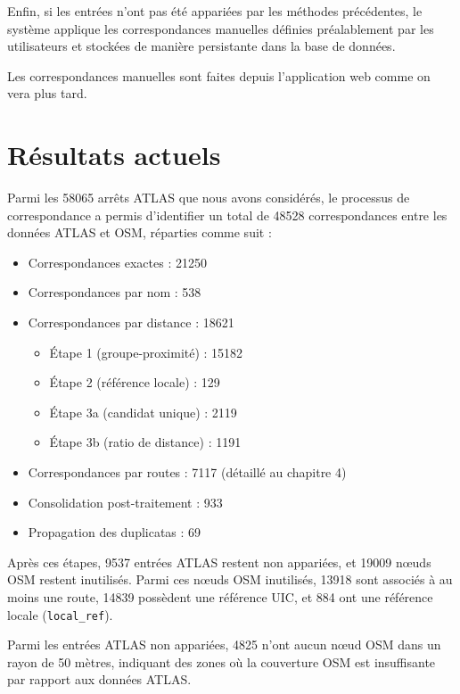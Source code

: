 Enfin, si les entrées n'ont pas été appariées par les méthodes précédentes, le système applique les correspondances manuelles définies préalablement par les utilisateurs et stockées de manière persistante dans la base de données. 

Les correspondances manuelles sont faites depuis l'application web comme on vera plus tard.

\section{Résultats actuels}

Parmi les 58065 arrêts ATLAS que nous avons considérés, le processus de correspondance a permis d'identifier un total de 48528 correspondances entre les données ATLAS et OSM, réparties comme suit :

\begin{itemize}
    \item Correspondances exactes : 21250
    \item Correspondances par nom : 538
    \item Correspondances par distance : 18621
    \begin{itemize}
        \item Étape 1 (groupe-proximité) : 15182
        \item Étape 2 (référence locale) : 129
        \item Étape 3a (candidat unique) : 2119
        \item Étape 3b (ratio de distance) : 1191
    \end{itemize}
    \item Correspondances par routes : 7117 (détaillé au chapitre 4)
    \item Consolidation post-traitement : 933
    \item Propagation des duplicatas : 69
\end{itemize}

Après ces étapes, 9537 entrées ATLAS restent non appariées, et 19009 nœuds OSM restent inutilisés. Parmi ces nœuds OSM inutilisés, 13918 sont associés à au moins une route, 14839 possèdent une référence UIC, et 884 ont une référence locale (\texttt{local\_ref}).

Parmi les entrées ATLAS non appariées, 4825 n'ont aucun nœud OSM dans un rayon de 50 mètres, indiquant des zones où la couverture OSM est insuffisante par rapport aux données ATLAS.


